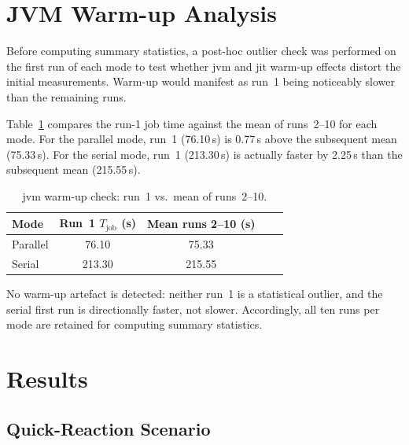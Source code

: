 \section{JVM Warm-up Analysis}
\label{subsec:eval-warmup}

Before computing summary statistics, a post-hoc outlier check was performed on
the first run of each mode to test whether \gls{jvm} and \gls{jit} warm-up effects distort the
initial measurements.  Warm-up would manifest as run~1 being noticeably slower than the
remaining runs.

Table~\ref{tab:warmup-check} compares the run-1 job time against the mean of runs~2--10
for each mode.  For the parallel mode, run~1 (76.10\,s) is 0.77\,s above
the subsequent mean (75.33\,s). For the serial mode, run~1 (213.30\,s) is actually
faster by 2.25\,s than the subsequent mean (215.55\,s).

\begin{table}[htbp]
\centering
\caption{\gls{jvm} warm-up check: run~1 vs.\ mean of runs~2--10.}
\label{tab:warmup-check}
\begin{tabular}{lcccc}
\toprule
Mode & Run~1 $T_{\text{job}}$ (s) & Mean runs 2--10 (s) \\
\midrule
Parallel & 76.10 & 75.33 \\
Serial   & 213.30 & 215.55 \\
\bottomrule
\end{tabular}
\end{table}

No warm-up artefact is detected: neither run~1 is a statistical outlier,
and the serial first run is directionally faster, not slower.
Accordingly, all ten runs per mode are retained for computing summary statistics.

\section{Results}
\label{sec:eval-results}

\subsection{Quick-Reaction Scenario}
\label{subsec:eval-qr}

